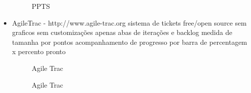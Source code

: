 \begin{itemize}
\begin{figure}[H]
  \centering
  \caption{PPTS}
\end{figure}

\item AgileTrac - http://www.agile-trac.org
sistema de tickets
free/open source
sem graficos
sem customizações
apenas abas de iterações e backlog
medida de tamanha por pontos
acompanhamento de progresso por barra de percentagem x percento pronto

\begin{figure}[H]
  \centering
  \caption{Agile Trac}
\end{figure}

\begin{figure}[H]
  \centering
  \caption{Agile Trac}
\end{figure}


\end{itemize}
